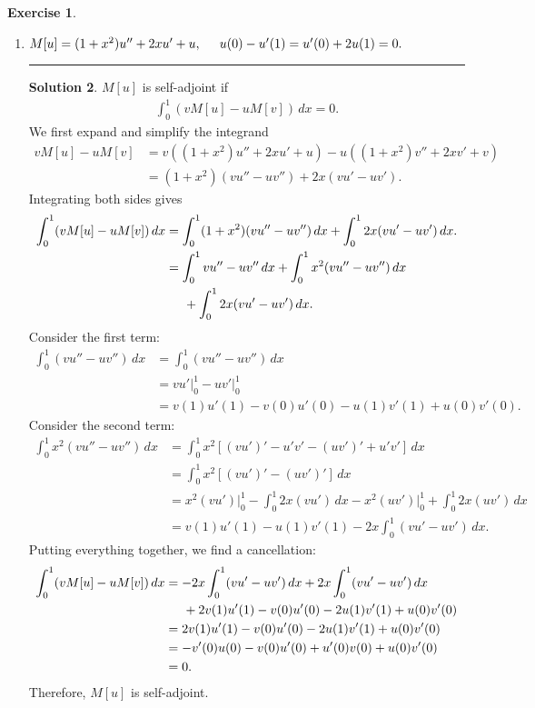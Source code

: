 \documentclass{article}
\theoremstyle{definition}
\newtheorem*{exer*}{Exercise}
\newtheorem*{sln*}{Solution}
\begin{document}
\begin{exer*}
\begin{enumerate}
\begin{sln*}
		\end{sln*}
		
		
		
		
		
		
		\newpage
		\item $M[u] = (1+x^2)u'' + 2xu' + u,\hspace{0.5cm} u(0) - u'(1) = u'(0) + 2u(1) = 0.$\\
			\noindent\rule{\textwidth}{0.5pt}
		\begin{sln*}
		$M[u]$ is self-adjoint if 
		\begin{align*}
		\int^1_0 (vM[u] - uM[v])\,dx = 0.
		\end{align*}
		We first expand and simplify the integrand
		\begin{align*}
		vM[u] - uM[v] &= v((1+x^2)u'' + 2xu' + u) - u((1+x^2)v'' + 2xv' + v)\\
		&= (1+x^2)(vu'' - uv'') + 2x(vu' - uv').
		\end{align*}
		Integrating both sides gives
		\begin{align*}
		\int^1_0 (vM[u] - uM[v])\,dx &= \int^1_0 (1+x^2)(vu'' - uv'')\,dx + \int^1_0 2x(vu' - uv')\,dx.\\
		&=\int^1_0 vu'' - uv''\,dx + \int^1_0 x^2(vu'' - uv'')\,dx\\
		&\hspace{0.5cm} + \int^1_0 2x(vu' - uv')\,dx.
		\end{align*}
		Consider the first term:
		\begin{align*}
		\int^1_0 (vu'' - uv'')\,dx &= \int^1_0 (vu'' - uv'')\,dx\\
		&= vu'\bigg\vert^1_0 - uv'\bigg\vert^1_0\\
		&= v(1)u'(1) - v(0)u'(0) - u(1)v'(1) + u(0)v'(0).
		\end{align*}
		Consider the second term:
		\begin{align*}
		\int^1_0 x^2(vu'' - uv'')\,dx &= \int^1_0 x^2 \left[ (vu')' - u'v' - (uv')' + u'v'  \right]\,dx\\
		&= \int^1_0 x^2\left[ (vu')' - (uv')' \right]\,dx\\
		&= x^2(vu')\bigg\vert^1_0 - \int^1_0 2x(vu')\,dx - x^2(uv')\bigg\vert^1_0 + \int^1_0 2x(uv')\,dx\\
		&= v(1)u'(1) - u(1)v'(1) - 2x\int^1_0 (vu' - uv')\,dx.
		\end{align*}
		Putting everything together, we find a cancellation:
		\begin{align*}
		\int^1_0 (vM[u] - uM[v])\,dx &= - 2x\int^1_0 (vu' - uv')\,dx + 2x\int^1_0 (vu' - uv')\,dx\\&\hspace{0.5cm} + 2v(1)u'(1) - v(0)u'(0) - 2u(1)v'(1) + u(0)v'(0)  \\
		&= 2v(1)u'(1) - v(0)u'(0) - 2u(1)v'(1) + u(0)v'(0)\\
		&= -v'(0)u(0) - v(0)u'(0) + u'(0)v(0) + u(0)v'(0)\\
		&= 0.
		\end{align*} 
		Therefore, $M[u]$ is self-adjoint. 
		

\end{sln*}
\end{enumerate}
\end{exer*}
\end{document}
